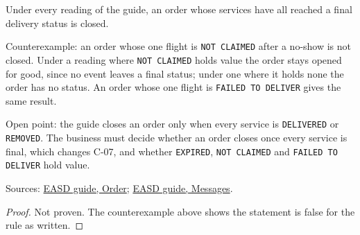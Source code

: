 \begin{theorem}
  \label{thm:delivery-all-final-closed}
  Under every reading of the guide, an order whose services have all
  reached a final delivery status is closed.

  Counterexample: an order whose one flight is \texttt{NOT CLAIMED} after a
  no-show is not closed.  Under a reading where \texttt{NOT CLAIMED} holds
  value the order stays opened for good, since no event leaves a final
  status; under one where it holds none the order has no status.  An order
  whose one flight is \texttt{FAILED TO DELIVER} gives the same result.

  Open point: the guide closes an order only when every service is
  \texttt{DELIVERED} or \texttt{REMOVED}.  The business must decide whether
  an order closes once every service is final, which changes C-07, and
  whether \texttt{EXPIRED}, \texttt{NOT CLAIMED} and
  \texttt{FAILED TO DELIVER} hold value.

  Sources: \href{https://standards.atlassian.net/wiki/spaces/EASD/pages/574849062/Order}{EASD guide, Order};
  \href{https://standards.atlassian.net/wiki/spaces/EASD/pages/574652427/Messages}{EASD guide, Messages}.
\end{theorem}
\begin{proof}
  Not proven.  The counterexample above shows the statement is false for
  the rule as written.
\end{proof}

